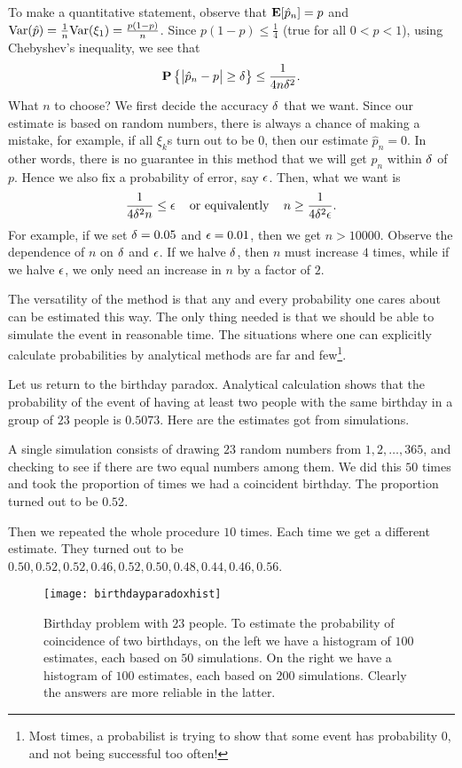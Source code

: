 \documentclass[preprint,  11pt]{amsart}
\begin{document}
To make a quantitative statement, observe that $\mathbf{E}[\hat{p}_n]=p$ and $\mbox{Var}(\hat{p})=\frac{1}{n}\mbox{Var}(\xi_1)=\frac{p(1-p)}{n}$. Since $p(1-p)\le \frac{1}{4}$ (true for all $0<p<1$), using Chebyshev's inequality, we see that
\begin{align*}
\mathbf{P}\left\{ \big| \hat{p}_n-p\big|\ge \delta \right\}\le \frac{1}{4n\delta^2}.
\end{align*} 
What $n$ to choose? We first decide the accuracy $\delta$ that  we want. Since our estimate is based on random numbers, there is always a chance of making a mistake, for example, if all $\xi_k$s turn out to be $0$, then our estimate $\hat{p}_n=0$. In other words, there is no guarantee in this method that we will get $\hat{p}_n$ within $\delta$ of $p$. Hence we also fix a probability of error, say $\epsilon$. Then, what we want is 
\begin{align*}
\frac{1}{4\delta^2 n}\le \epsilon \;\;\; \mbox{ or equivalently }\;\;\; n\ge \frac{1}{4\delta^2 \epsilon}.
\end{align*}
For example, if we set $\delta=0.05$ and $\epsilon=0.01$, then we get $n>10000$. Observe the dependence of $n$ on $\delta$ and $\epsilon$. If we halve $\delta$, then $n$ must increase $4$ times, while if we halve $\epsilon$, we only need an increase in $n$ by a factor of $2$.

The versatility of the method is that any and every probability one cares about can be estimated this way. The only thing needed is that we should be able to simulate the event in reasonable time. The situations where one can  explicitly calculate probabilities by analytical methods are far and few\footnote{Most times, a probabilist is trying to show that some event has probability $0$, and not being successful too often!}. 

\beg Let us return to the birthday paradox. Analytical calculation shows that the probability of the event of having at least two people with the same birthday in a group of $23$ people is $0.5073$. Here are the estimates got from simulations.

A single simulation consists of drawing $23$ random numbers from $1,2,\ldots ,365$, and checking to see if there are two equal numbers among them. We did this $50$ times and took the proportion of times we had a coincident birthday. The proportion turned out to be $0.52$.

Then we repeated the whole procedure $10$ times. Each time we get a different estimate. They turned out to be $0.50, 0.52, 0.52, 0.46, 0.52, 0.50, 0.48, 0.44, 0.46, 0.56$. 
\begin{figure}
\texttt{[image: birthdayparadoxhist]}
\caption{Birthday problem with $23$ people. To estimate the probability of coincidence of two birthdays, on the left we have a histogram of $100$ estimates, each based on $50$  simulations. On the right we have a histogram of $100$ estimates, each based on $200$ simulations. Clearly the answers are more reliable in the latter.}
\end{figure}
\end{document}
